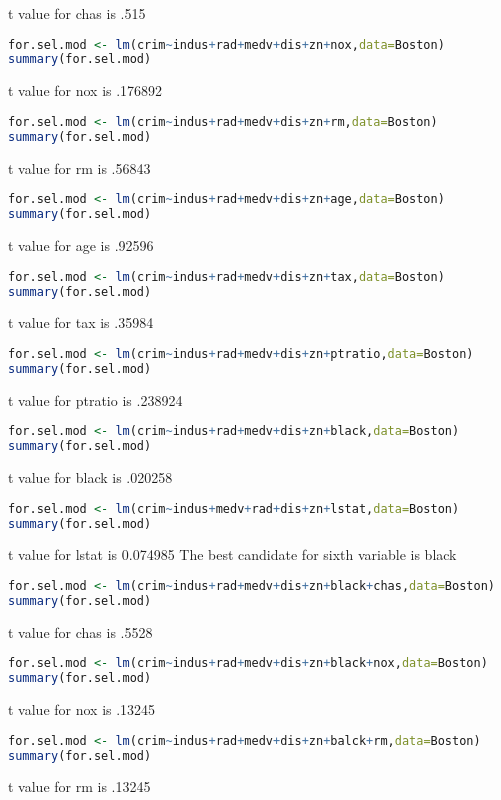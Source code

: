 \documentclass[11pt]{report}
\begin{document}
\begin{itemize}
\begin{lstlisting}[language=R]
\end{lstlisting}
t value for chas is .515
\begin{lstlisting}[language=R]
for.sel.mod <- lm(crim~indus+rad+medv+dis+zn+nox,data=Boston)
summary(for.sel.mod)
\end{lstlisting}
t value for nox is .176892
\begin{lstlisting}[language=R]
for.sel.mod <- lm(crim~indus+rad+medv+dis+zn+rm,data=Boston)
summary(for.sel.mod)
\end{lstlisting}
t value for rm is .56843
\begin{lstlisting}[language=R]
for.sel.mod <- lm(crim~indus+rad+medv+dis+zn+age,data=Boston)
summary(for.sel.mod)
\end{lstlisting}
t value for age is .92596
\begin{lstlisting}[language=R]
for.sel.mod <- lm(crim~indus+rad+medv+dis+zn+tax,data=Boston)
summary(for.sel.mod)
\end{lstlisting}
t value for tax is .35984
\begin{lstlisting}[language=R]
for.sel.mod <- lm(crim~indus+rad+medv+dis+zn+ptratio,data=Boston)
summary(for.sel.mod)
\end{lstlisting}
t value for ptratio is .238924
\begin{lstlisting}[language=R]
for.sel.mod <- lm(crim~indus+rad+medv+dis+zn+black,data=Boston)
summary(for.sel.mod)
\end{lstlisting}
t value for black is .020258
\begin{lstlisting}[language=R]
for.sel.mod <- lm(crim~indus+medv+rad+dis+zn+lstat,data=Boston)
summary(for.sel.mod)
\end{lstlisting}
t value for lstat is 0.074985
The best candidate for sixth variable is black
\begin{lstlisting}[language=R]
for.sel.mod <- lm(crim~indus+rad+medv+dis+zn+black+chas,data=Boston)
summary(for.sel.mod)
\end{lstlisting}
t value for chas is .5528
\begin{lstlisting}[language=R]
for.sel.mod <- lm(crim~indus+rad+medv+dis+zn+black+nox,data=Boston)
summary(for.sel.mod)
\end{lstlisting}
t value for nox is .13245
\begin{lstlisting}[language=R]
for.sel.mod <- lm(crim~indus+rad+medv+dis+zn+balck+rm,data=Boston)
summary(for.sel.mod)
\end{lstlisting}
t value for rm is .13245
\begin{lstlisting}[language=R]

\end{lstlisting}
\end{itemize}
\end{document}

